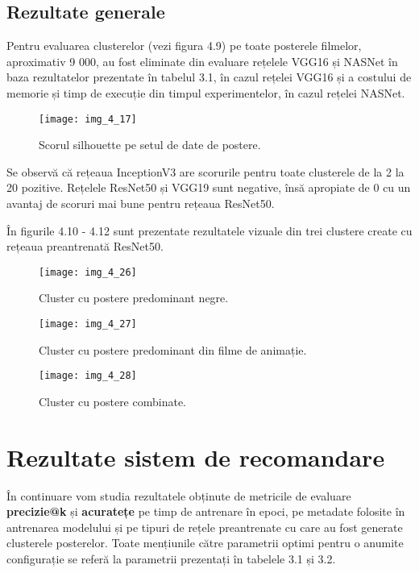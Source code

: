 \FloatBarrier
\subsection{Rezultate generale}
Pentru evaluarea clusterelor (vezi figura 4.9) pe toate posterele filmelor, aproximativ 9 000, au fost eliminate din evaluare rețelele VGG16 și NASNet în baza rezultatelor prezentate în tabelul 3.1, în cazul rețelei VGG16 și a costului de memorie și timp de execuție din timpul experimentelor, în cazul rețelei NASNet.
\begin{figure}[!h]
	\centering
	\texttt{[image: img\_4\_17]}
	\caption[Scorul silhouette pe setul de date de postere]{Scorul silhouette pe setul de date de postere.}
\end{figure} 
Se observă că rețeaua InceptionV3 are scorurile pentru toate clusterele de la 2 la 20 pozitive. Rețelele ResNet50 și VGG19 sunt negative, însă apropiate de 0 cu un avantaj de scoruri mai bune pentru rețeaua ResNet50.

În figurile 4.10 - 4.12 sunt prezentate rezultatele vizuale din trei clustere create cu rețeaua preantrenată ResNet50.
\begin{figure}[!h]
	\centering
	\texttt{[image: img\_4\_26]}
	\caption[Cluster cu postere predominant negre]{Cluster cu postere predominant negre.}
\end{figure} 
\begin{figure}[!h]
	\centering
	\texttt{[image: img\_4\_27]}
	\caption[Cluster cu postere predominant din filme de animație]{Cluster cu postere predominant din filme de animație.}
\end{figure} 
\begin{figure}[!h]
	\centering
	\texttt{[image: img\_4\_28]}
	\caption[Cluster cu postere combinate]{Cluster cu postere combinate.}
\end{figure} 

\section{Rezultate sistem de recomandare}
În continuare vom studia rezultatele obținute de metricile de evaluare \textbf{precizie@k} și \textbf{acuratețe} pe timp de antrenare în epoci, pe metadate folosite în antrenarea modelului și pe tipuri de rețele preantrenate cu care au fost generate clusterele posterelor. Toate mențiunile către parametrii optimi pentru o anumite configurație se referă la parametrii prezentați în tabelele 3.1 și 3.2.

